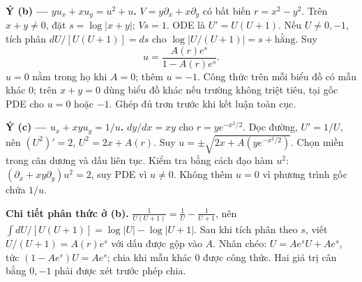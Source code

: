 \documentclass[10pt,a4paper]{article}
\begin{document}
\textbf{Ý (b) — $yu_x+xu_y=u^2+u$.} $V=y\partial_x+x\partial_y$ có bất biến $r=x^2-y^2$. Trên $x+y\ne0$, đặt $s=\log|x+y|$; $Vs=1$. ODE là $U'=U(U+1)$. Nếu $U\ne0,-1$, tích phân $dU/[U(U+1)]=ds$ cho $\log|U/(U+1)|=s+\text{hằng}$. Suy
\[u=\frac{A(r)e^s}{1-A(r)e^s}.\]
$u=0$ nằm trong họ khi $A=0$; thêm $u=-1$. Công thức trên mỗi biểu đồ có mẫu khác 0; trên $x+y=0$ dùng biểu đồ khác nếu trường không triệt tiêu, tại gốc PDE cho $u=0$ hoặc $-1$. Ghép đủ trơn trước khi kết luận toàn cục.

\textbf{Ý (c) — $u_x+xyu_y=1/u$.} $dy/dx=xy$ cho $r=ye^{-x^2/2}$. Dọc đường, $U'=1/U$, nên $(U^2)'=2$, $U^2=2x+A(r)$. Suy $u=\pm\sqrt{2x+A(ye^{-x^2/2})}$. Chọn miền trong căn dương và dấu liên tục. Kiểm tra bằng cách đạo hàm $u^2$: $(\partial_x+xy\partial_y)u^2=2$, suy PDE vì $u\ne0$. Không thêm $u=0$ vì phương trình gốc chứa $1/u$.

\textbf{Chi tiết phân thức ở (b).} $\frac1{U(U+1)}=\frac1U-\frac1{U+1}$, nên $\int dU/[U(U+1)]=\log|U|-\log|U+1|$. Sau khi tích phân theo $s$, viết $U/(U+1)=A(r)e^s$ với dấu được gộp vào $A$. Nhân chéo: $U=Ae^sU+Ae^s$, tức $(1-Ae^s)U=Ae^s$; chia khi mẫu khác $0$ được công thức. Hai giá trị cân bằng $0,-1$ phải được xét trước phép chia.
\end{document}

